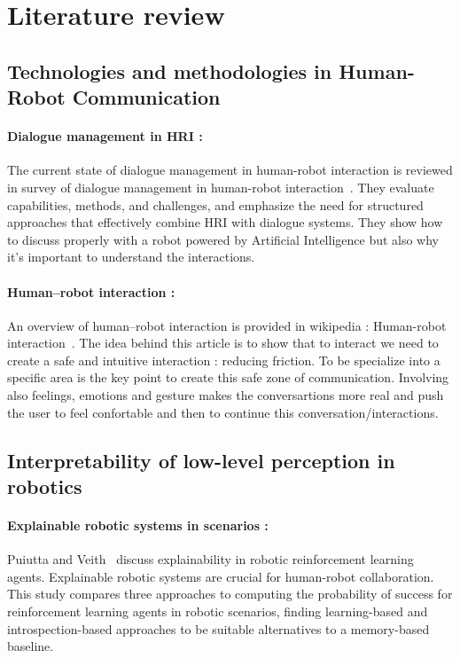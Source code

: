\section{Literature review}

\subsection{Technologies and methodologies in Human-Robot Communication}

\paragraph{Dialogue management in HRI :}
The current state of dialogue management in human-robot interaction is reviewed in survey of dialogue management in human-robot interaction~\cite{dialogue-hri-review}.
They evaluate capabilities, methods, and challenges, and emphasize the need for structured approaches that effectively combine HRI with dialogue systems.
They show how to discuss properly with a robot powered by Artificial Intelligence but also why it's important to understand the interactions.

\paragraph{Human–robot interaction :}
An overview of human–robot interaction is provided in wikipedia : Human-robot interaction~\cite{hri-overview}.
The idea behind this article is to show that to interact we need to create a safe and intuitive interaction : reducing friction. To be specialize into a specific area is the key point to create this safe zone of communication.
Involving also feelings, emotions and gesture makes the conversartions more real and push the user to feel confortable and then to continue this conversation/interactions.

\subsection{Interpretability of low-level perception in robotics}

\paragraph{Explainable robotic systems in scenarios :}
Puiutta and Veith~\cite{explainable-rl} discuss explainability in robotic reinforcement learning agents.
Explainable robotic systems are crucial for human-robot collaboration.
This study compares three approaches to computing the probability of success for reinforcement learning agents in robotic scenarios, finding learning-based and introspection-based approaches to be suitable alternatives to a memory-based baseline.


